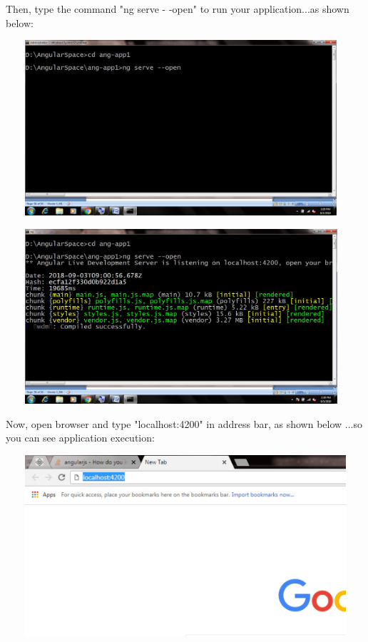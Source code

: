 \documentclass{article}
\begin{document}
\noindent Then, type the command "ng serve - -open" to run your application...as shown below:

\begin{center}
	\noindent \includegraphics*[width=5.12in, height=2.56in, trim=0.00in 0.24in 0.00in 0.00in]{IMG-01-23}
\end{center}

\begin{center}
	\noindent \includegraphics*[width=5.12in, height=2.56in, trim=0.00in 0.16in 0.00in 0.00in]{IMG-01-24}
\end{center}

\noindent 

\noindent Now, open browser and type "localhost:4200" in address bar, as shown below ...so you can see application execution:

\begin{center}
	\noindent \includegraphics*[width=5.26in, height=2.64in]{IMG-01-25}
\end{center}
\end{document}
